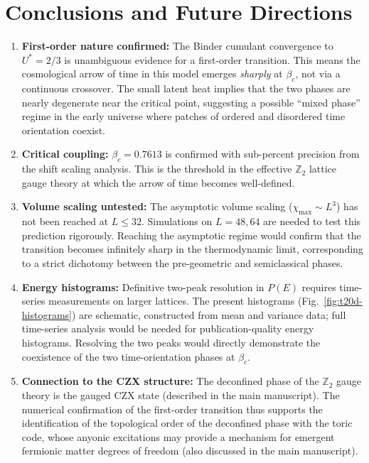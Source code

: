 \documentclass{article}
\begin{document}
\section{Conclusions and Future Directions}

\begin{enumerate}
\item \textbf{First-order nature confirmed:} The Binder cumulant convergence to $U^* = 2/3$ is unambiguous evidence for a first-order transition. This means the cosmological arrow of time in this model emerges \emph{sharply} at $\beta_c$, not via a continuous crossover. The small latent heat implies that the two phases are nearly degenerate near the critical point, suggesting a possible ``mixed phase'' regime in the early universe where patches of ordered and disordered time orientation coexist.

\item \textbf{Critical coupling:} $\beta_c = 0.7613$ is confirmed with sub-percent precision from the shift scaling analysis. This is the threshold in the effective $\mathbb{Z}_2$ lattice gauge theory at which the arrow of time becomes well-defined.

\item \textbf{Volume scaling untested:} The asymptotic volume scaling ($\chi_\text{max} \sim L^3$) has not been reached at $L \leq 32$. Simulations on $L = 48, 64$ are needed to test this prediction rigorously. Reaching the asymptotic regime would confirm that the transition becomes infinitely sharp in the thermodynamic limit, corresponding to a strict dichotomy between the pre-geometric and semiclassical phases.

\item \textbf{Energy histograms:} Definitive two-peak resolution in $P(E)$ requires time-series measurements on larger lattices. The present histograms (Fig.~\ref{fig:t20d-histograms}) are schematic, constructed from mean and variance data; full time-series analysis would be needed for publication-quality energy histograms. Resolving the two peaks would directly demonstrate the coexistence of the two time-orientation phases at $\beta_c$.

\item \textbf{Connection to the CZX structure:} The deconfined phase of the $\mathbb{Z}_2$ gauge theory is the gauged CZX state (described in the main manuscript). The numerical confirmation of the first-order transition thus supports the identification of the topological order of the deconfined phase with the toric code, whose anyonic excitations may provide a mechanism for emergent fermionic matter degrees of freedom (also discussed in the main manuscript).
\end{enumerate}
\end{document}
